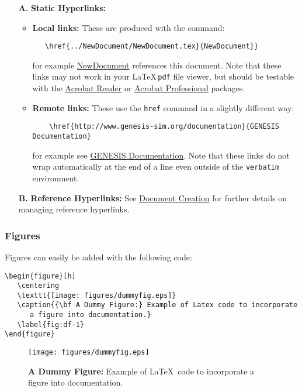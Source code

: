 \documentclass[12pt]{article}
\begin{document}
\begin{itemize}
\item[{\bf A.}]{\bf Static Hyperlinks:} 
   \begin{itemize}
      \item{\bf Local links:} These are produced with the command:
\begin{verbatim}
   \href{../NewDocument/NewDocument.tex}{NewDocument}}
\end{verbatim}
for example \href{../NewDocument/NewDocument.tex}{NewDocument} references this document.
Note that these links may not work in your \LaTeX\,{\tt pdf} file viewer, but should be testable with the \href{http://get.adobe.com/reader/}{Acrobat Reader} or \href{http://www.adobe.com/products/acrobatpro/tryout.html}{Acrobat Professional} packages.
      \item {\bf Remote links:} These use the {\tt href} command in a slightly different way:
\begin{verbatim}
    \href{http://www.genesis-sim.org/documentation}{GENESIS Documentation}
\end{verbatim}
for example see \href{http://www.genesis-sim.org/documentation}{GENESIS Documentation}. Note that these links do not wrap automatically at the end of a line even outside of the {\tt verbatim} environment.
\end{itemize}

\item[{\bf B.}]{\bf Reference Hyperlinks:} See \href{../document-create/document-create.tex}{Document Creation} for further details on managing reference hyperlinks.

\end{itemize}

\subsubsection*{Figures}

Figures can easily be added with the following code:

\begin{verbatim}
\begin{figure}[h]
   \centering
   \texttt{[image: figures/dummyfig.eps]}
   \caption{{\bf A Dummy Figure:} Example of Latex code to incorporate
      a figure into documentation.}
   \label{fig:df-1}
\end{figure}
\end{verbatim}

\begin{figure}[h]
  \centering
   \texttt{[image: figures/dummyfig.eps]}
\caption{{\bf A Dummy Figure:} Example of \LaTeX\,\,\,code to incorporate a figure into documentation.}
  \label{fig:df-2}
\end{figure}



\end{document}
